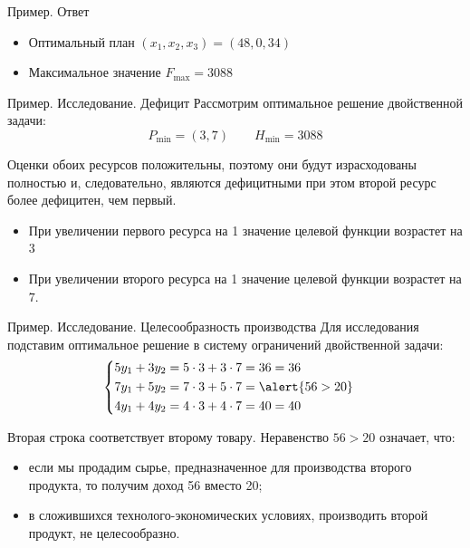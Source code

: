 \documentclass[unicode,11pt,notheorems,xcolor=table]{beamer}
\begin{document}
\begin{frame}{Пример. Ответ}
\begin{itemize}
\item 
	Оптимальный план $(x_1,x_2,x_3)=(48,0,34)$
\item 
	Максимальное значение $F_{\max}=3088$
\end{itemize}
\end{frame}

\begin{frame}{Пример. Исследование. Дефицит}
Рассмотрим оптимальное решение двойственной задачи:
$$
	P_{\min}=(3,7)
	\qquad
	H_{\min}=3088
$$

Оценки обоих ресурсов  положительны, поэтому они будут израсходованы полностью и, следовательно, являются дефицитными при этом второй ресурс более дефицитен, чем первый.


\begin{itemize}
\item 
	При увеличении первого ресурса на 1 значение целевой функции возрастет на $3$
\item 
	При увеличении второго ресурса на 1 значение целевой функции возрастет на $7$.
\end{itemize}

\end{frame}
\begin{frame}{Пример. Исследование. Целесообразность производства}
Для исследования 
подставим оптимальное решение в систему ограничений двойственной задачи:
$$
 \left\lbrace
  \begin{aligned}
  	5y_1+3y_2 & = 5\cdot 3 + 3\cdot 7  = 36 = 36\\
  	7y_1+5y_2 & = 7\cdot 3 + 5\cdot 7 = \alert{56 > 20}\\
   	4y_1+4y_2 & = 4\cdot 3 + 4\cdot 7=40= 40\\
  \end{aligned}  \right.\quad
$$

Вторая строка соответствует второму товару. Неравенство $56>20$ означает, что:
\begin{itemize}
\item 
	если мы продадим сырье, предназначенное для производства второго продукта, то получим доход 56 вместо 20;
 
\item 
	в сложившихся технолого-экономических условиях, \alert{производить второй продукт, не целесообразно}.
\end{itemize}
\end{frame}
\end{document}
